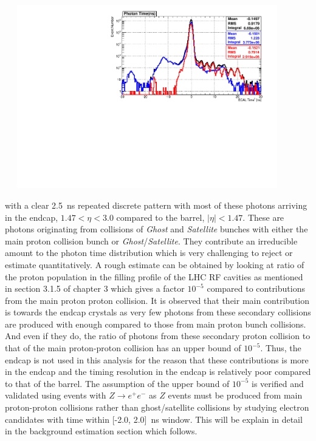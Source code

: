 \begin{center}
\centering
\mbox{
\includegraphics[height=8cm, width=0.9\textwidth]{THESISPLOTS/PhotonECALTimePtMTH50-C-D-SinglePhotonDataset.pdf}
}
\label{fig:TIMEECAL}
\end{center}

with a clear 2.5~ns repeated discrete pattern with most of these photons arriving in the endcap, $ 1.47 < \eta < 3.0$ compared to the barrel, $|\eta| < 1.47$. These are photons originating from collisions of \textit{Ghost} and \textit{Satellite} bunches with either the main proton collision bunch or \textit{Ghost}/\textit{Satellite}. They contribute an irreducible amount to the photon time distribution which is very challenging to reject or estimate quantitatively. A rough estimate can be obtained by looking at ratio of the proton population in the filling profile of the LHC RF cavities as mentioned in section 3.1.5 of chapter 3 which gives a factor $10^{-5}$ compared to contributions from the main proton proton collision. It is observed that their main contribution is towards the endcap crystals as very few photons from these secondary collisions are produced with enough \pt compared to those from main proton bunch collisions. And even if they do, the ratio of photons from these secondary proton collision to that of the main proton-proton collision has an upper bound of  $10^{-5}$. 
Thus, the endcap is not used in this analysis for the reason that these contributions is more in the endcap and the timing resolution in the endcap is relatively poor compared to that of the barrel.
The assumption of the upper bound of $10^{-5}$ is verified and validated using events with $Z\rightarrow e^{+}e^{-}$ as $Z$ events must be produced from main proton-proton collisions rather than  ghost/satellite collisions by studying electron candidates with time within [-2.0, 2.0]~ns window. This will be explain in detail in the background estimation section which follows.


